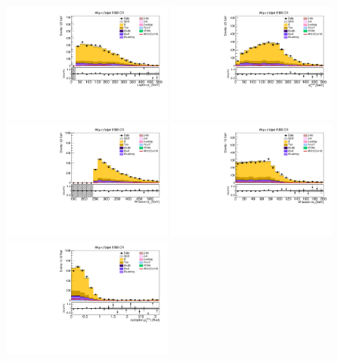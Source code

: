 \begin{figure}[tbp]
  \begin{center}
    \includegraphics[width=0.48\textwidth]{figures/wlnhbb2016/boosted/WmnWHTT2bFJCR_lepton1Pt.pdf}
    \includegraphics[width=0.48\textwidth]{figures/wlnhbb2016/boosted/WmnWHTT2bFJCR_pfmet.pdf}
    \includegraphics[width=0.48\textwidth]{figures/wlnhbb2016/boosted/WmnWHTT2bFJCR_topWBosonPt.pdf}
    \includegraphics[width=0.48\textwidth]{figures/wlnhbb2016/boosted/WmnWHTT2bFJCR_mT.pdf}
    \includegraphics[width=0.48\textwidth]{figures/wlnhbb2016/boosted/WmnWHTT2bFJCR_deltaPhiLep1Met.pdf}

\end{center}
\end{figure}

